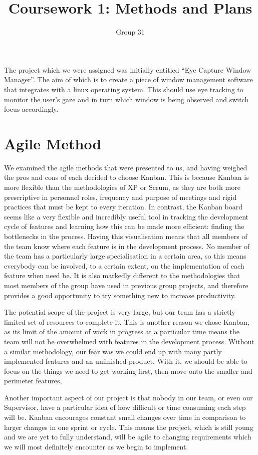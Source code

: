 \documentclass{article}
\title{Coursework 1: Methods and Plans}
\author{Group 31}
\begin{document}
\maketitle
The project which we were assigned was initially entitled “Eye Capture Window Manager”.  The aim of which is to create a piece of window management software that integrates with a linux operating system.  This should use eye tracking to monitor the user’s gaze and in turn which window is being observed and switch focus accordingly.
\section*{Agile Method}
We examined the agile methods that were presented to us, and having weighed the pros and cons of each decided to choose Kanban.  This is because Kanban is more flexible than the methodologies of XP or Scrum, as they are both more prescriptive in personnel roles, frequency and purpose of meetings and rigid practices that must be kept to every iteration.  In contrast, the Kanban board seems like a very flexible and  incredibly useful tool in tracking the development cycle of features and learning how this can be made more efficient: finding the bottlenecks in the process.  Having this visualisation means that all members of the team know where each feature is in the development process.  No member of the team has a particularly large specialisation in a certain area, so this means everybody can be involved, to a certain extent, on the implementation of each feature when need be. It is also markedly different to the methodologies that most members of the group have used in previous group projects, and therefore provides a good opportunity to try something new to increase productivity.

The potential scope of the project is very large, but our team has a strictly limited set of resources to complete it.  This is another reason we chose Kanban, as its limit of the amount of work in progress at a particular time means the team will not be overwhelmed with features in the development process.   Without a similar methodology, our fear was we could end up with many partly implemented features and an unfinished product. With it, we should be able to focus on the things we need to get working first, then move onto the smaller and perimeter features,

Another important aspect of our project is that nobody in our team, or even our Supervisor, have a particular idea of how difficult or time consuming each step will be. Kanban encourages constant small changes over time in comparison to larger changes in one sprint or cycle.  This means the project, which is still young and we are yet to fully understand, will be agile to changing requirements which we will most definitely encounter as we begin to implement.
\end{document}

